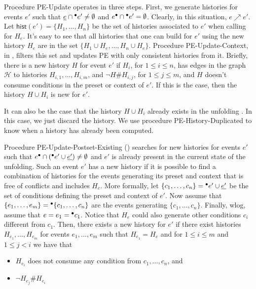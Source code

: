 \documentclass[11pt]{article}
\newcommand{\hist}[1]{\ensuremath{\mathsf{hist}(#1)}}
\newcommand{\h}{\ensuremath{\mathcal{H}}}
\newcommand{\pe}{{\sc PE}}
\newcommand{\peupdate}{{\sc PE-Update}}
\newcommand{\peupdatecont}{{\sc PE-Update-Context}}
\newcommand{\peupdatepostexisting}{{\sc PE-Update-Postset-Existing}}
\newcommand{\pehistdup}{{\sc PE-History-Duplicated}}
\begin{document}
Procedure \peupdate{} operates in three steps.  First, we generate histories
for events $e'$ such that $\underline{e} \cap {}^\bullet e' \neq \emptyset$ and $e^\bullet
\cap {}^\bullet e' = \emptyset$.  Clearly, in this situation, $e \nearrow e'$.  Let
$\hist{e'} = \{H_1, \ldots, H_n\}$ be the set of histories associated to $e'$
when calling  for $H_e$.  It's easy to see that all histories
that one can build for $e'$ using the new history $H_e$ are in the set $\{H_1
\cup H_e, \ldots, H_n \cup H_e\}$.  Procedure \peupdatecont{}, in
, filters this set and updates \pe{} with only consistent
histories from it.  Briefly, there is a new history $H$ for event $e'$ if
$H_i$, for $1 \le i \le n$, has edges in the graph $\h$ to histories $H_{i,1},
\ldots, H_{i,m}$, and $\lnot H \# H_{i,j}$, for $1 \le j \le m$, and $H$ doesn't
consume conditions in the preset or context of $e'$.  If this is the case, then
the history $H \cup H_i$ is new for $e'$.

It can also be the case that the history $H \cup H_i$ already exists in the
unfolding .  In this case, we just discard the
history.  We use procedure \pehistdup{} to know when a history has already been
computed.

Procedure \peupdatepostexisting{} () searches for
new histories for events $e'$ such that $e^\bullet \cap ({}^\bullet e' \cup
\underline{e'}) \neq \emptyset$ and $e'$ is already present in the current state of
the unfolding.  Such an event $e'$ has a new history if it is possible to find
a combination of histories for the events generating its preset and context
that is free of conflicts and includes $H_e$.  More formally, let $\{c_1,
\ldots, c_n\} = {}^\bullet e' \cup \underline{e'}$ be the set of conditions defining the
preset and context of $e'$.  Now assume that $\{e_1, \ldots, e_m\} =
{}^\bullet\{c_1, \ldots, c_n\}$ are the events generating $\{c_1, \ldots, c_n\}$.
Finally, wlog, assume that $e = e_1 = {}^\bullet c_1$.  Notice that $H_e$ could also
generate other conditions $c_i$ different from $c_1$.  Then, there exists a new
history for $e'$ if there exist histories $H_{e_1}, \ldots, H_{e_m}$ for events
$e_1, \ldots, e_m$ such that $H_{e_1} = H_e$ and for $1 \le i \le m$ and $1 \le
j < i$ we have that

\begin{itemize}
\item $H_{e_i}$ does not consume any condition from $c_1, \ldots, c_n$, and
\item $\lnot H_{e_j} \# H_{e_i}$
\end{itemize}
\end{document}
